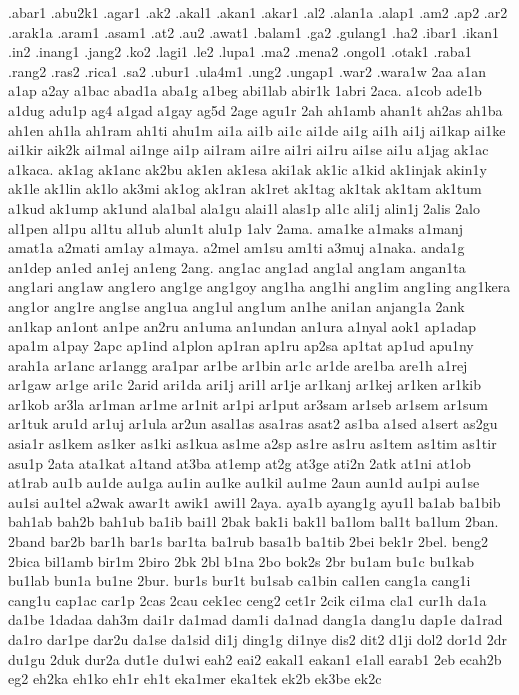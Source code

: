 .abar1
.abu2k1
.agar1
.ak2
.akal1
.akan1
.akar1
.al2
.alan1a
.alap1
.am2
.ap2
.ar2
.arak1a
.aram1
.asam1
.at2
.au2
.awat1
.balam1
.ga2
.gulang1
.ha2
.ibar1
.ikan1
.in2
.inang1
.jang2
.ko2
.lagi1
.le2
.lupa1
.ma2
.mena2
.ongol1
.otak1
.raba1
.rang2
.ras2
.rica1
.sa2
.ubur1
.ula4m1
.ung2
.ungap1
.war2
.wara1w
2aa
a1an
a1ap
a2ay
a1bac
abad1a
aba1g
a1beg
abi1lab
abir1k
1abri
2aca.
a1cob
ade1b
a1dug
adu1p
ag4
a1gad
a1gay
ag5d
2age
agu1r
2ah
ah1amb
ahan1t
ah2as
ah1ba
ah1en
ah1la
ah1ram
ah1ti
ahu1m
ai1a
ai1b
ai1c
ai1de
ai1g
ai1h
ai1j
ai1kap
ai1ke
ai1kir
aik2k
ai1mal
ai1nge
ai1p
ai1ram
ai1re
ai1ri
ai1ru
ai1se
ai1u
a1jag
ak1ac
a1kaca.
ak1ag
ak1anc
ak2bu
ak1en
ak1esa
aki1ak
ak1ic
a1kid
ak1injak
akin1y
ak1le
ak1lin
ak1lo
ak3mi
ak1og
ak1ran
ak1ret
ak1tag
ak1tak
ak1tam
ak1tum
a1kud
ak1ump
ak1und
ala1bal
ala1gu
alai1l
alas1p
al1c
ali1j
alin1j
2alis
2alo
al1pen
al1pu
al1tu
al1ub
alun1t
alu1p
1alv
2ama.
ama1ke
a1maks
a1manj
amat1a
a2mati
am1ay
a1maya.
a2mel
am1su
am1ti
a3muj
a1naka.
anda1g
an1dep
an1ed
an1ej
an1eng
2ang.
ang1ac
ang1ad
ang1al
ang1am
angan1ta
ang1ari
ang1aw
ang1ero
ang1ge
ang1goy
ang1ha
ang1hi
ang1im
ang1ing
ang1kera
ang1or
ang1re
ang1se
ang1ua
ang1ul
ang1um
an1he
ani1an
anjang1a
2ank
an1kap
an1ont
an1pe
an2ru
an1uma
an1undan
an1ura
a1nyal
aok1
ap1adap
apa1m
a1pay
2apc
ap1ind
a1plon
ap1ran
ap1ru
ap2sa
ap1tat
ap1ud
apu1ny
arah1a
ar1anc
ar1angg
ara1par
ar1be
ar1bin
ar1c
ar1de
are1ba
are1h
a1rej
ar1gaw
ar1ge
ari1c
2arid
ari1da
ari1j
ari1l
ar1je
ar1kanj
ar1kej
ar1ken
ar1kib
ar1kob
ar3la
ar1man
ar1me
ar1nit
ar1pi
ar1put
ar3sam
ar1seb
ar1sem
ar1sum
ar1tuk
aru1d
ar1uj
ar1ula
ar2un
asal1as
asa1ras
asat2
as1ba
a1sed
a1sert
as2gu
asia1r
as1kem
as1ker
as1ki
as1kua
as1me
a2sp
as1re
as1ru
as1tem
as1tim
as1tir
asu1p
2ata
ata1kat
a1tand
at3ba
at1emp
at2g
at3ge
ati2n
2atk
at1ni
at1ob
at1rab
au1b
au1de
au1ga
au1in
au1ke
au1kil
au1me
2aun
aun1d
au1pi
au1se
au1si
au1tel
a2wak
awar1t
awik1
awi1l
2aya.
aya1b
ayang1g
ayu1l
ba1ab
ba1bib
bah1ab
bah2b
bah1ub
ba1ib
bai1l
2bak
bak1i
bak1l
ba1lom
bal1t
ba1lum
2ban.
2band
bar2b
bar1h
bar1s
bar1ta
ba1rub
basa1b
ba1tib
2bei
bek1r
2bel.
beng2
2bica
bil1amb
bir1m
2biro
2bk
2bl
b1na
2bo
bok2s
2br
bu1am
bu1c
bu1kab
bu1lab
bun1a
bu1ne
2bur.
bur1s
bur1t
bu1sab
ca1bin
cal1en
cang1a
cang1i
cang1u
cap1ac
car1p
2cas
2cau
cek1ec
ceng2
cet1r
2cik
ci1ma
cla1
cur1h
da1a
da1be
1dadaa
dah3m
dai1r
da1mad
dam1i
da1nad
dang1a
dang1u
dap1e
da1rad
da1ro
dar1pe
dar2u
da1se
da1sid
di1j
ding1g
di1nye
dis2
dit2
d1ji
dol2
dor1d
2dr
du1gu
2duk
dur2a
dut1e
du1wi
eah2
eai2
eakal1
eakan1
e1all
earab1
2eb
ecah2b
eg2
eh2ka
eh1ko
eh1r
eh1t
eka1mer
eka1tek
ek2b
ek3be
ek2c
